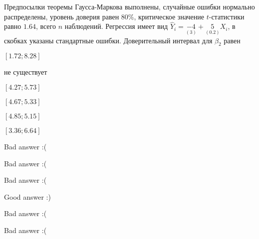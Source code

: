 
\begin{question}
Предпосылки теоремы Гаусса-Маркова выполнены, случайные ошибки нормально распределены,
уровень доверия равен \(80\)\%, критическое значение \(t\)-статистики равно
\(1.64\), всего \(n\) наблюдений.
Регрессия имеет вид \(\hat Y_i = \underset{(3)}{-4} + \underset{(0.2)}{5}X_i\),
в скобках указаны стандартные ошибки. Доверительный интервал для \(\beta_2\) равен
\begin{answerlist}
  \item \([1.72; 8.28]\)
  \item не существует
  \item \([4.27; 5.73]\)
  \item \([4.67; 5.33]\)
  \item \([4.85; 5.15]\)
  \item \([3.36; 6.64]\)
\end{answerlist}
\end{question}

\begin{solution}
\begin{answerlist}
  \item Bad answer :(
  \item Bad answer :(
  \item Bad answer :(
  \item Good answer :)
  \item Bad answer :(
  \item Bad answer :(
\end{answerlist}
\end{solution}

